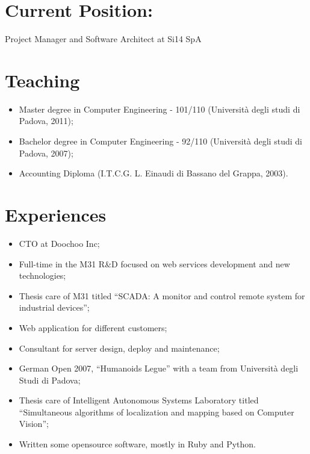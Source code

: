 \documentclass[pdftex, a4paper, 11pt]{article}
\begin{document}
\section*{Current Position:}

Project Manager and Software Architect at Si14 SpA


\section*{Teaching}
\begin{itemize}
\item Master degree in Computer Engineering - 101/110 (Universit\`a degli studi di Padova, 2011);
\item Bachelor degree in Computer Engineering - 92/110 (Universit\`a degli studi di Padova, 2007);
\item Accounting Diploma (I.T.C.G. L. Einaudi di Bassano del Grappa, 2003).
\end{itemize}

\section*{Experiences}
\begin{itemize}
\item CTO at Doochoo Inc;
\item Full-time in the M31 R\&D focused on web services development and new technologies;
\item Thesis care of M31 titled ``SCADA: A monitor and control remote system for industrial devices'';
\item Web application for different customers;
\item Consultant for server design, deploy and maintenance;
\item German Open 2007, ``Humanoids Legue'' with a team from Universit\`a
degli Studi di Padova;
\item Thesis care of Intelligent Autonomous Systems Laboratory titled ``Simultaneous
algorithms of localization and mapping based on Computer Vision'';
\item Written some opensource software, mostly in Ruby and Python.
\end{itemize}
\end{document}
